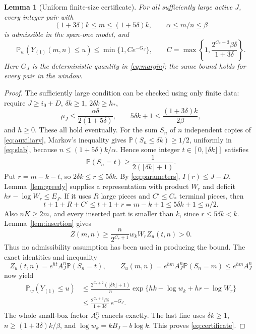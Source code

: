 \documentclass[11pt]{article}
\newtheorem{lemma}[theorem]{Lemma}
\theoremstyle{remark}\newtheorem{remark}[theorem]{Remark}
\newcommand{\Pp}{\mathbb P}
\begin{document}
\begin{lemma}[Uniform finite-size certificate]\label{lem:certificate}
For all sufficiently large active $J$, every integer pair with
\begin{equation}\label{eq:slab}
 (1+3\delta)k\le m\le(1+5\delta)k,\qquad
 \alpha\le m/n\le\beta
\end{equation}
is admissible in the span-one model, and
\begin{equation}\label{eq:certificate}
 \Pp_w(Y_{(1)}(m,n)\le u)\le\min\{1,C e^{-G_J}\},\qquad
 C=\max\left\{1,\frac{2^{C_*+3}\beta\delta}{1+3\delta}\right\}.
\end{equation}
Here $G_J$ is the deterministic quantity in \eqref{eq:margin}; the same
bound holds for every pair in the window.
\end{lemma}

\begin{proof}
The sufficiently large condition can be checked using only finite data:
require $J\ge i_0+D$, $\delta k\ge1$, $2\delta k\ge h_*$,
\begin{equation}\label{eq:finiteconditions}
 \mu_J\le\frac{\alpha\delta}{2(1+5\delta)},\qquad
 5\delta k+1\le\frac{(1+3\delta)k}{2\beta},
\end{equation}
and $h\ge0$. These all hold eventually. For the sum $S_n$ of $n$
independent copies of \eqref{eq:auxiliary}, Markov's inequality gives
$\Pp(S_n\le\delta k)\ge1/2$, uniformly in \eqref{eq:slab}, because
$n\le(1+5\delta)k/\alpha$. Hence some integer
$t\in[0,\lfloor\delta k\rfloor]$ satisfies
\begin{equation}\label{eq:atom}
 \Pp(S_n=t)\ge\frac1{2(\lfloor\delta k\rfloor+1)}.
\end{equation}
Put $r=m-k-t$, so $2\delta k\le r\le5\delta k$. By
\eqref{eq:parameters}, $I(r)\le J-D$. Lemma~\ref{lem:greedy} supplies a
representation with product $W_r$ and deficit $hr-\log W_r\le E_J$.
If it uses $R$ large pieces and $C'\le C_*$ terminal pieces, then
\[
 t+1+R+C'\le t+1+r=m-k+1\le5\delta k+1\le n/2.
\]
Also $nK\ge2m$, and every inserted part is smaller than $k$, since
$r\le5\delta k<k$. Lemma~\ref{lem:insertion} gives
\[
 Z(m,n)\ge\frac{n}{2^{C_*+1}}w_kW_r Z_u(t,n)>0.
\]
Thus no admissibility assumption has been used in producing the bound.
The exact identities and inequality
\[
 Z_u(t,n)=e^{ht}A_J^n\Pp(S_n=t),\qquad
 Z_u(m,n)=e^{hm}A_J^n\Pp(S_n=m)\le e^{hm}A_J^n
\]
now yield
\begin{align*}
 \Pp_w(Y_{(1)}\le u)
 &\le\frac{2^{C_*+2}(\lfloor\delta k\rfloor+1)}n
       \exp\{hk-\log w_k+hr-\log W_r\}\\
 &\le\frac{2^{C_*+3}\beta\delta}{1+3\delta}\,e^{-G_J}.
\end{align*}
The whole small-box factor $A_J^n$ cancels exactly. The last line uses
$\delta k\ge1$, $n\ge(1+3\delta)k/\beta$, and
$\log w_k=kB_J-b\log k$. This proves \eqref{eq:certificate}.
\end{proof}
\end{document}
